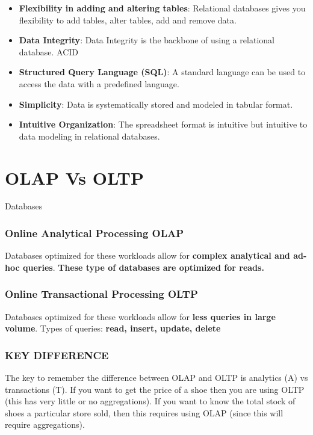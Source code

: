 \documentclass[
	paper=a4,%
	pagesize,%
	8pt, fleqn,%
	headings=small,%
	notitlepage,%
	parskip=never]%
	{scrreprt}
\begin{document}
\begin{multicols*}{3}
\begin{itemize}
\item \textbf{Flexibility in adding and altering tables}: Relational databases gives you flexibility to add tables, alter tables, add and remove data.

\item \textbf{Data Integrity}: Data Integrity is the backbone of using a relational database. ACID

\item \textbf{Structured Query Language (SQL)}: A standard language can be used to access the data with a predefined language.

\item \textbf{Simplicity}: Data is systematically stored and modeled in tabular format.

\item \textbf{Intuitive Organization}: The spreadsheet format is intuitive but intuitive to data modeling in relational databases.
\end{itemize}

\section{OLAP Vs OLTP}
Databases \subsubsection{Online Analytical Processing OLAP}
Databases optimized for these workloads allow for \textbf{complex analytical and ad-hoc queries}. 
\textbf{These type of databases are optimized for reads.}

\subsubsection{Online Transactional Processing OLTP}
Databases optimized for these workloads allow for \textbf{less queries in large volume}. 
Types of queries: \textbf{read, insert, update, delete}

\subsubsection*{KEY DIFFERENCE}
The key to remember the difference between OLAP and OLTP is analytics (A) vs transactions (T). If you want to get the price of a shoe then you are using OLTP (this has very little or no aggregations). If you want to know the total stock of shoes a particular store sold, then this requires using OLAP (since this will require aggregations).



\end{multicols*}
\end{document}
